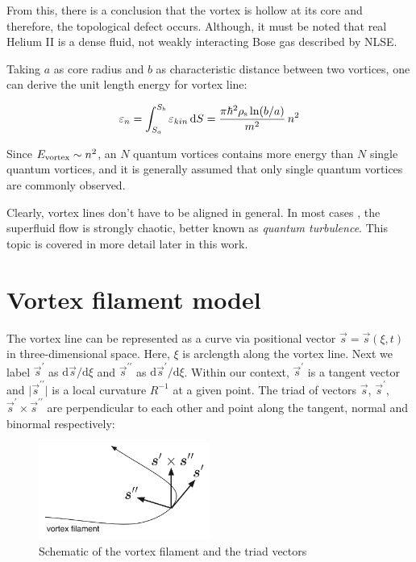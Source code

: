 From this, there is a conclusion that the vortex is hollow at its core and therefore, the topological defect occurs. Although, it must be noted that real Helium II is a dense fluid, not weakly interacting Bose gas described by NLSE.

Taking $a$ as core radius and $b$ as characteristic distance between two vortices, one can derive the unit length energy for vortex line:

\begin{equation}
\varepsilon_n
= \int_{S_a}^{S_b} \varepsilon_{kin}\,\mathrm{d}S
= \frac{\pi \hbar^2 \rho_{\mathrm{s}} \ln(b/a)}{m^2}\, n^2
\label{eps_n}
\end{equation}

Since $E_{\mathrm{vortex}} \sim n^2$, an $N$ quantum vortices contains more energy than $N$ single quantum vortices, and it is generally assumed that only single quantum vortices are commonly observed.

Clearly, vortex lines don't have to be aligned in general. In most cases , the superfluid flow is strongly chaotic, better known as \textit{quantum turbulence}. This topic is covered in more detail later in this work.

\newpage

\section{Vortex filament model}

The vortex line can be represented as a curve via positional vector $\vec{s} = \vec{s}(\xi, t)$ in three-dimensional space. Here, $\xi$ is arclength along the vortex line. Next we label $\vec{s}^{\prime}$ as $\text{d}\vec{s} / \text{d} \xi$ and $\vec{s}^{\prime\prime}$ as $\text{d}\vec{s}^{\prime} / \text{d} \xi$.
Within our context, $\vec{s}^{\prime}$ is a tangent vector and $\vert \vec{s}^{\prime\prime} \vert$ is a local curvature $R^{-1}$ at a given point. The triad of vectors $\vec{s}$, $\vec{s}^{\prime}$, $\vec{s}^{\prime} \times \vec{s}^{\prime\prime}$ are perpendicular to each other and point along the tangent, normal and binormal respectively:

\begin{figure}[h]
	\centering
	\includegraphics[width=0.5\textwidth]{graphics/theory/filament}
	\caption{Schematic of the vortex filament and the triad vectors}
	\label{filament}
\end{figure}


